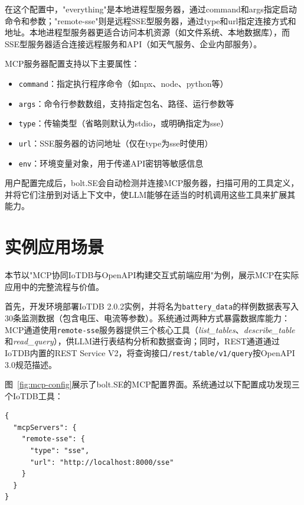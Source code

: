 在这个配置中，"everything"是本地进程型服务器，通过command和args指定启动命令和参数；"remote-sse"则是远程SSE型服务器，通过type和url指定连接方式和地址。本地进程型服务器更适合访问本机资源（如文件系统、本地数据库），而SSE型服务器适合连接远程服务和API（如天气服务、企业内部服务）。

MCP服务器配置支持以下主要属性：
\begin{itemize}
  \item \texttt{command}：指定执行程序命令（如npx、node、python等）
  \item \texttt{args}：命令行参数数组，支持指定包名、路径、运行参数等
  \item \texttt{type}：传输类型（省略则默认为stdio，或明确指定为sse）
  \item \texttt{url}：SSE服务器的访问地址（仅在type为sse时使用）
  \item \texttt{env}：环境变量对象，用于传递API密钥等敏感信息
\end{itemize}

用户配置完成后，bolt.SE会自动检测并连接MCP服务器，扫描可用的工具定义，并将它们注册到对话上下文中，使LLM能够在适当的时机调用这些工具来扩展其能力。

\section{实例应用场景}
\label{sec:mcp-iotdb-demo}

本节以"MCP协同IoTDB与OpenAPI构建交互式前端应用"为例，展示MCP在实际应用中的完整流程与价值。


首先，开发环境部署IoTDB 2.0.2实例，并将名为\texttt{battery\_data}的样例数据表写入30条监测数据（包含电压、电流等参数）。系统通过两种方式暴露数据库能力：MCP通道使用\texttt{remote-sse}服务器提供三个核心工具（\textit{list\_tables}、\textit{describe\_table}和\textit{read\_query}），供LLM进行表结构分析和数据查询；同时，REST通道通过IoTDB内置的REST Service V2，将查询接口\texttt{/rest/table/v1/query}按OpenAPI 3.0规范描述。

图~\ref{fig:mcp-config}展示了bolt.SE的MCP配置界面。系统通过以下配置成功发现三个IoTDB工具：

\begin{verbatim}
{
  "mcpServers": {
    "remote-sse": {
      "type": "sse",
      "url": "http://localhost:8000/sse"
    }
  }
}
\end{verbatim}

